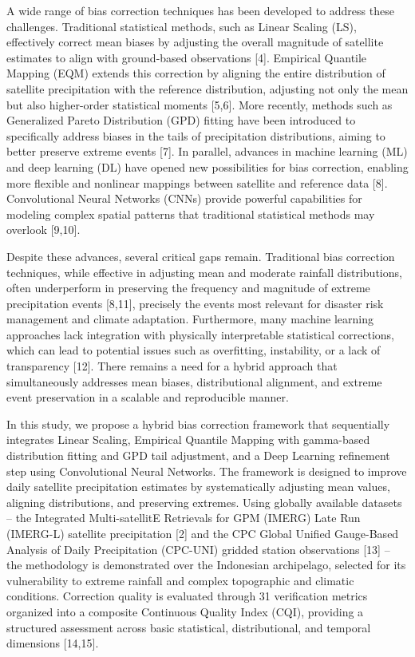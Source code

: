 \documentclass[
]{article}
\begin{document}
A wide range of bias correction techniques has been developed to address
these challenges. Traditional statistical methods, such as Linear
Scaling (LS), effectively correct mean biases by adjusting the overall
magnitude of satellite estimates to align with ground-based observations
{[}4{]}. Empirical Quantile Mapping (EQM) extends this correction by
aligning the entire distribution of satellite precipitation with the
reference distribution, adjusting not only the mean but also
higher-order statistical moments {[}5,6{]}. More recently, methods such
as Generalized Pareto Distribution (GPD) fitting have been introduced to
specifically address biases in the tails of precipitation distributions,
aiming to better preserve extreme events {[}7{]}. In parallel, advances
in machine learning (ML) and deep learning (DL) have opened new
possibilities for bias correction, enabling more flexible and nonlinear
mappings between satellite and reference data {[}8{]}. Convolutional
Neural Networks (CNNs) provide powerful capabilities for modeling
complex spatial patterns that traditional statistical methods may
overlook {[}9,10{]}.

Despite these advances, several critical gaps remain. Traditional bias
correction techniques, while effective in adjusting mean and moderate
rainfall distributions, often underperform in preserving the frequency
and magnitude of extreme precipitation events {[}8,11{]}, precisely the
events most relevant for disaster risk management and climate
adaptation. Furthermore, many machine learning approaches lack
integration with physically interpretable statistical corrections, which
can lead to potential issues such as overfitting, instability, or a lack
of transparency {[}12{]}. There remains a need for a hybrid approach
that simultaneously addresses mean biases, distributional alignment, and
extreme event preservation in a scalable and reproducible manner.

In this study, we propose a hybrid bias correction framework that
sequentially integrates Linear Scaling, Empirical Quantile Mapping with
gamma-based distribution fitting and GPD tail adjustment, and a Deep
Learning refinement step using Convolutional Neural Networks. The
framework is designed to improve daily satellite precipitation estimates
by systematically adjusting mean values, aligning distributions, and
preserving extremes. Using globally available datasets -- the Integrated
Multi-satellitE Retrievals for GPM (IMERG) Late Run (IMERG-L) satellite
precipitation {[}2{]} and the CPC Global Unified Gauge-Based Analysis of
Daily Precipitation (CPC-UNI) gridded station observations {[}13{]} --
the methodology is demonstrated over the Indonesian archipelago,
selected for its vulnerability to extreme rainfall and complex
topographic and climatic conditions. Correction quality is evaluated
through 31 verification metrics organized into a composite Continuous
Quality Index (CQI), providing a structured assessment across basic
statistical, distributional, and temporal dimensions {[}14,15{]}.
\end{document}
